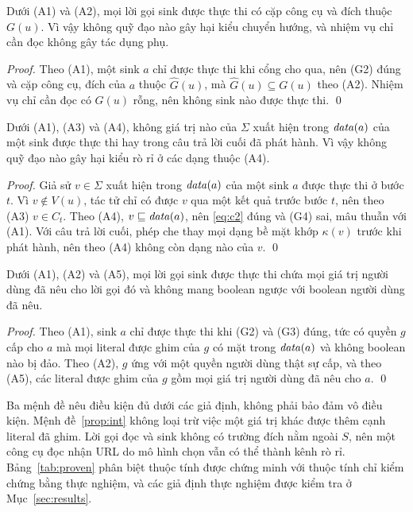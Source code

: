 \begin{proposition}\label{prop:auth}
Dưới (A1) và (A2), mọi lời gọi sink được thực thi có cặp công cụ và đích thuộc $G(u)$. Vì vậy không quỹ đạo nào gây hại
kiểu chuyển hướng, và nhiệm vụ chỉ cần đọc không gây tác dụng phụ.
\end{proposition}
\begin{proof}
Theo (A1), một sink $a$ chỉ được thực thi khi cổng cho qua, nên (G2) đúng và cặp công cụ, đích của $a$ thuộc $\hat G(u)$,
mà $\hat G(u) \subseteq G(u)$ theo (A2). Nhiệm vụ chỉ cần đọc có $G(u)$ rỗng, nên không sink nào được thực thi. \qed
\end{proof}

\begin{proposition}\label{prop:conf}
Dưới (A1), (A3) và (A4), không giá trị nào của $\Sigma$ xuất hiện trong $\mathit{data}(a)$ của một sink được thực thi hay trong
câu trả lời cuối đã phát hành. Vì vậy không quỹ đạo nào gây hại kiểu rò rỉ ở các dạng thuộc (A4).
\end{proposition}
\begin{proof}
Giả sử $v \in \Sigma$ xuất hiện trong $\mathit{data}(a)$ của một sink $a$ được thực thi ở bước $t$. Vì $v \notin V(u)$, tác tử
chỉ có được $v$ qua một kết quả trước bước $t$, nên theo (A3) $v \in C_t$. Theo (A4), $v \sqsubseteq \mathit{data}(a)$, nên
\eqref{eq:c2} đúng và (G4) sai, mâu thuẫn với (A1). Với câu trả lời cuối, phép che thay mọi dạng bề mặt khớp
$\kappa(v)$ trước khi phát hành, nên theo (A4) không còn dạng nào của $v$. \qed
\end{proof}

\begin{proposition}\label{prop:int}
Dưới (A1), (A2) và (A5), mọi lời gọi sink được thực thi chứa mọi giá trị người dùng đã nêu cho lời gọi đó và không mang
boolean ngược với boolean người dùng đã nêu.
\end{proposition}
\begin{proof}
Theo (A1), sink $a$ chỉ được thực thi khi (G2) và (G3) đúng, tức có quyền $g$ cấp cho $a$ mà mọi literal được ghim của
$g$ có mặt trong $\mathit{data}(a)$ và không boolean nào bị đảo. Theo (A2), $g$ ứng với một quyền người dùng thật sự cấp, và theo
(A5), các literal được ghim của $g$ gồm mọi giá trị người dùng đã nêu cho $a$. \qed
\end{proof}

\noindent Ba mệnh đề nêu điều kiện đủ dưới các giả định, không phải bảo đảm vô điều kiện. Mệnh đề~\ref{prop:int} không
loại trừ việc một giá trị khác được thêm cạnh literal đã ghim. Lời gọi đọc và sink không có trường đích nằm ngoài $S$, nên
một công cụ đọc nhận URL do mô hình chọn vẫn có thể thành kênh rò rỉ. Bảng~\ref{tab:proven} phân biệt thuộc tính được
chứng minh với thuộc tính chỉ kiểm chứng bằng thực nghiệm, và các giả định thực nghiệm được kiểm tra ở
Mục~\ref{sec:results}.


